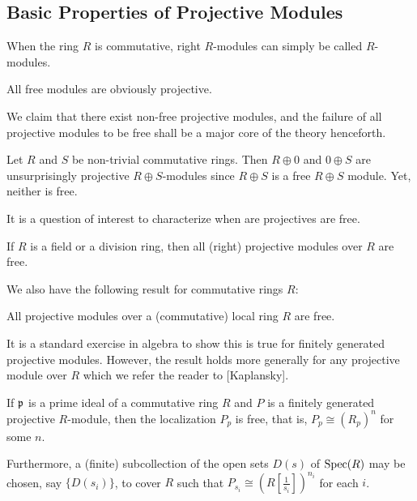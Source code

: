 %  

\subsection{Basic Properties of Projective Modules}

When the ring $R$ is commutative, right $R$-modules can simply be called $R$-modules.

\begin{example}
All free modules are obviously projective. 
\end{example}

We claim that there exist non-free projective modules, and the failure of all projective modules
to be free shall be a major core of the theory henceforth.

\begin{example}\label{ch1:component_free}
Let $R$ and $S$ be non-trivial commutative rings. Then $R \oplus 0$ and $0 \oplus S$ are unsurprisingly projective $R \oplus S$-modules since $R \oplus S$ is a free
$R \oplus S$ module.
Yet, neither is free.
\end{example}

It is a question of interest to characterize when are projectives are free. 
\begin{proposition}
If $R$ is a field or a division ring, then all (right) projective modules over $R$ are free. 
\end{proposition}


We also have the following result for commutative rings $R$: 

\begin{proposition}
All projective modules over a (commutative) local ring $R$ are free.
\end{proposition}
It is a standard exercise in algebra to show this is true for finitely generated projective modules.
However, the result holds more generally for any projective module over $R$ which we refer the reader to [Kaplansky].

\begin{proposition}\label{prop:projlocal}
If $\mathfrak{p}$ is a prime ideal of a commutative ring $R$ and $P$ is a finitely generated projective $R$-module,
then the localization $P_p$ is free, that is, $P_p \cong (R_p)^n$ for some $n$.

Furthermore, a (finite) subcollection of the open sets $D(s)$ of $\operatorname*{Spec}(R)$ may be chosen, say $\{D(s_i)\}$, to cover $R$
such that $P_{s_i} \cong (R[\frac{1}{s_i}])^{n_i}$ for each $i$.
\end{proposition}

